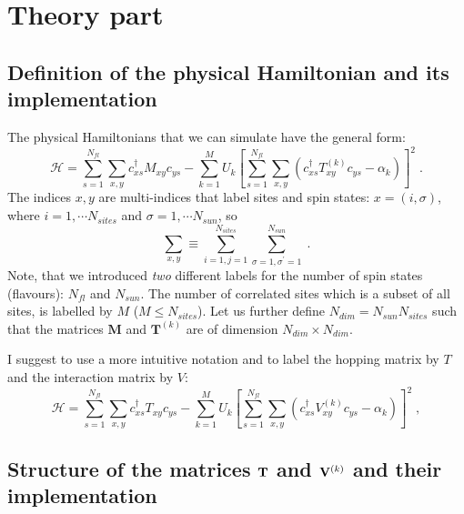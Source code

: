 \section{Theory part}


\subsection{Definition of the physical Hamiltonian and its implementation}

The physical Hamiltonians that we can simulate have the general form:
\begin{equation}
\label{eqn_general_ham1}
\mathcal{H}
=\sum\limits_{s=1}^{N_{fl}}\sum\limits_{x,y}
c^{\dagger}_{x s}M_{xy}c^{\phantom\dagger}_{ys}
-\sum\limits_{k=1}^{M}U_{k}\left[
\sum\limits_{s=1}^{N_{fl}}\sum\limits_{x,y}
\left( 
c^{\dagger}_{xs}T^{(k)}_{xy}c^{\phantom\dagger}_{ys}-\alpha_{k}
\right)
\right]^{2}\;.
\end{equation}
The indices $x,y$ are multi-indices that label sites and spin states: $x=(i,\sigma)$, 
where $i=1,\cdots N_{sites}$ and $\sigma=1,\cdots N_{sun}$, so
\begin{equation}
\sum\limits_{x,y}\equiv
\sum\limits_{i=1,j=1}^{N_{sites}}\sum\limits_{\sigma=1,\sigma^{\prime}=1}^{N_{sun}}\;.
\end{equation}
Note, that  we introduced \textit{two} different labels for the number of spin states (flavours): 
$N_{fl}$ and $N_{sun}$.
The number of correlated sites which is a subset of all sites, is labelled by $M$  ($M\leq N_{sites}$).
Let us further define  $N_{dim}=N_{sun} N_{sites}$ such that the matrices $\bm{M}$ and $\bm{T}^{(k)}$ are of dimension $N_{dim}\times N_{dim}$.

I suggest to use a more intuitive notation and to label the hopping matrix by $T$ and the interaction matrix by $V$:
\begin{equation}
\label{eqn_general_ham2}
\mathcal{H}
=\sum\limits_{s=1}^{N_{fl}}\sum\limits_{x,y}
c^{\dagger}_{xs}T_{xy}c^{\phantom\dagger}_{ys}
-\sum\limits_{k=1}^{M}U_{k}\left[
\sum\limits_{s=1}^{N_{fl}}\sum\limits_{x,y}
\left( 
c^{\dagger}_{xs}V^{(k)}_{xy}c^{\phantom\dagger}_{y s}-\alpha_{k}
\right)
\right]^{2}\;,
\end{equation}

\subsection{Structure of the matrices ${\bf T}$ and ${\bf V}^{(k)}$ and their implementation}

